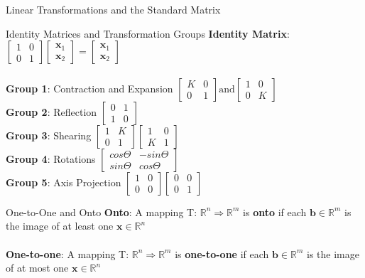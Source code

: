 \documentclass[a4paper, 12pt]{article}
\begin{document}
\begin{section}{Linear Transformations and the Standard Matrix}
\begin{subsection}{Identity Matrices and Transformation Groups}
\textbf{Identity Matrix}: 
$\begin{bmatrix} 1 & 0 \\ 0 & 1 \end{bmatrix} 
\begin{bmatrix} \textbf{x}_1 \\ \textbf{x}_2 \end{bmatrix} 
= \begin{bmatrix} \textbf{x}_1 \\ \textbf{x}_2 \end{bmatrix} $
\\
\\ \textbf{Group 1}: Contraction and Expansion 
$\begin{bmatrix} K & 0 \\ 0 & 1 \end{bmatrix} \mbox{and} 
\begin{bmatrix} 1 & 0 \\ 0 & K \end{bmatrix}$
\\
\textbf{Group 2}: Reflection 
$\begin{bmatrix} 0 & 1 \\ 1 & 0 \end{bmatrix}$
\\
\textbf{Group 3}: Shearing
$\begin{bmatrix} 1 & K \\ 0 & 1 \end{bmatrix}
\begin{bmatrix} 1 & 0 \\ K & 1\end{bmatrix}  $
\\
\textbf{Group 4}: Rotations
$\begin{bmatrix} cos\Theta & -sin\Theta \\
sin\Theta & cos\Theta \end{bmatrix} $
\\
\textbf{Group 5}: Axis Projection
$\begin{bmatrix} 1 & 0 \\ 0 & 0 \end{bmatrix} 
\begin{bmatrix} 0 & 0 \\ 0 & 1 \end{bmatrix} $
\end{subsection}

\begin{subsection}{One-to-One and Onto}
\Large{\textbf{Onto}}: A mapping T: 
$\mathbb{R}^n\Rightarrow\mathbb{R}^m$ is \textbf{onto} if each
$\textbf{b}\in\mathbb{R}^m$ is the image of at least one
$\textbf{x}\in\mathbb{R}^n$ \\
\\ \noindent\Large{\textbf{One-to-one}}: A mapping 
T: $\mathbb{R}^n\Rightarrow\mathbb{R}^m$ is \textbf{one-to-one}
if each $\textbf{b}\in\mathbb{R}^m$ is the image of at most one
$\textbf{x}\in\mathbb{R}^n$
\end{subsection}
\end{section}
\end{document}
